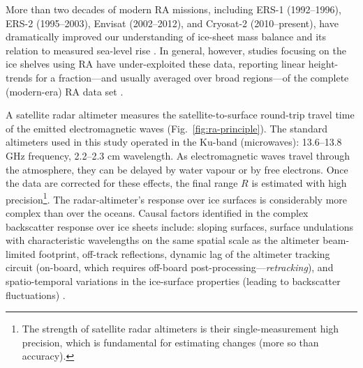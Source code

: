 More than two decades of modern RA missions,
including ERS-1 (1992--1996), ERS-2 (1995--2003), Envisat (2002--2012), and Cryosat-2 (2010--present), have dramatically improved our understanding of ice-sheet
mass balance and its relation to measured sea-level rise \parencite[e.g.,][]{Shepherd2012, Wingham2006}. In general, however,
studies focusing on the ice shelves using RA have under-exploited these data,
reporting linear height-trends for a fraction---and usually averaged over broad regions---of the complete (modern-era) RA data set \parencite[e.g.,][]{Shepherd2003, Shepherd2010, Zwally2005}.

A satellite radar altimeter measures the satellite-to-surface round-trip travel time of the emitted electromagnetic waves (Fig.~\ref{fig:ra-principle}). The standard altimeters used in this study operated in the Ku-band (microwaves): 13.6--13.8 GHz frequency, 2.2--2.3 cm wavelength. As electromagnetic waves travel through the atmosphere, they can be delayed by water vapour or by free electrons. Once the data are corrected for these effects, the final range $R$ is estimated with high precision\footnote{The strength of satellite radar altimeters is their single-measurement high precision, which is fundamental for estimating changes (more so than accuracy).}. The radar-altimeter's response over ice surfaces is considerably more complex than over the oceans. Causal factors identified in the complex backscatter response over ice sheets include: sloping surfaces, surface undulations with characteristic wavelengths on the same spatial scale as the altimeter beam-limited footprint, off-track reflections, dynamic lag of the altimeter tracking circuit (on-board, which requires off-board post-processing---\emph{retracking}), and spatio-temporal variations in the ice-surface properties (leading to backscatter fluctuations) \parencite{Martin1983}. %


